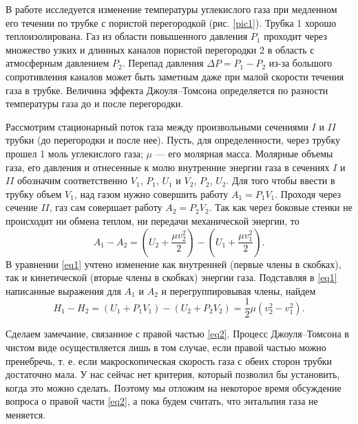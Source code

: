 \documentclass[a4paper, 12pt]{article}
\begin{document}
    В работе исследуется изменение температуры углекислого газа при медленном его течении по трубке с пористой перегородкой (рис. \ref{pic1}). Трубка 1 хорошо теплоизолирована. Газ из области повышенного давления $P_1$ проходит через множество узких и длинных каналов пористой перегородки 2 в область с атмосферным давлением $P_2$. Перепад давления $\Delta P = P_1 - P_2$ из-за большого сопротивления каналов может быть заметным даже при малой скорости течения газа в трубке. Величина эффекта Джоуля–Томсона определяется по разности температуры газа до и после перегородки.
    
    Рассмотрим стационарный поток газа между произвольными сечениями $I$ и $II$ трубки (до перегородки и после нее). Пусть, для определенности, через трубку прошел 1 моль углекислого газа; $\mu$ — его молярная масса. Молярные объемы газа, его давления и отнесенные к молю внутренние энергии газа в сечениях $I$ и $II$ обозначим соответственно $V_1$, $P_1$, $U_1$ и $V_2$, $P_2$, $U_2$. Для того чтобы ввести в трубку объем $V_1$, над газом нужно совершить работу $A_1 = P_1 V_1$. Проходя через сечение $II$, газ сам совершает работу $A_2 = P_2 V_2$. Так как через боковые стенки не происходит ни обмена теплом, ни передачи механической энергии, то
    \begin{equation}
        A_1 - A_2 = \left( U_2 + \frac{\mu v_2^2}{2} \right) - \left( U_1 + \frac{\mu v_1^2}{2} \right).
        \label{eq1}
    \end{equation}
    В уравнении \eqref{eq1} учтено изменение как внутренней (первые члены в скобках), так и кинетической (вторые члены в скобках) энергии газа. Подставляя в \eqref{eq1} написанные выражения для $A_1$ и $A_2$ и перегруппировывая члены, найдем
    \begin{equation}
        H_1 - H_2 = (U_1 + P_1 V_1) - (U_2 + P_2 V_2) = \frac{1}{2} \mu (v_2^2 - v_1^2).
        \label{eq2}
    \end{equation}
    
    Сделаем замечание, связанное с правой частью \eqref{eq2}. Процесс Джоуля–Томсона в чистом виде осуществляется лишь в том случае, если правой частью можно пренебречь, т. е. если макроскопическая скорость газа с обеих сторон трубки достаточно мала. У нас сейчас нет критерия, который позволил бы установить, когда это можно сделать. Поэтому мы отложим на некоторое время обсуждение вопроса о правой части \eqref{eq2}, а пока будем считать, что энтальпия газа не меняется.
    
\end{document}
